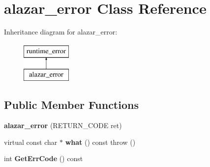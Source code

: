 \hypertarget{classalazar__error}{}\section{alazar\+\_\+error Class Reference}
\label{classalazar__error}
Inheritance diagram for alazar\+\_\+error\+:\begin{figure}[H]
\begin{center}
\leavevmode
\includegraphics[height=2.000000cm]{classalazar__error}
\end{center}
\end{figure}
\subsection*{Public Member Functions}
\begin{DoxyCompactItemize}
\item 
{\bfseries alazar\+\_\+error} (R\+E\+T\+U\+R\+N\+\_\+\+C\+O\+DE ret)\hypertarget{classalazar__error_a762da54dc850295e0d06cbcd4ca0c02c}{}\label{classalazar__error_a762da54dc850295e0d06cbcd4ca0c02c}

\item 
virtual const char $\ast$ {\bfseries what} () const   throw ()\hypertarget{classalazar__error_a4aea33558f69d777c9d383c844021ddd}{}\label{classalazar__error_a4aea33558f69d777c9d383c844021ddd}

\item 
int {\bfseries Get\+Err\+Code} () const \hypertarget{classalazar__error_ac759f6b1f2eeb82daa2861ec10b875ad}{}\label{classalazar__error_ac759f6b1f2eeb82daa2861ec10b875ad}

\end{DoxyCompactItemize}

